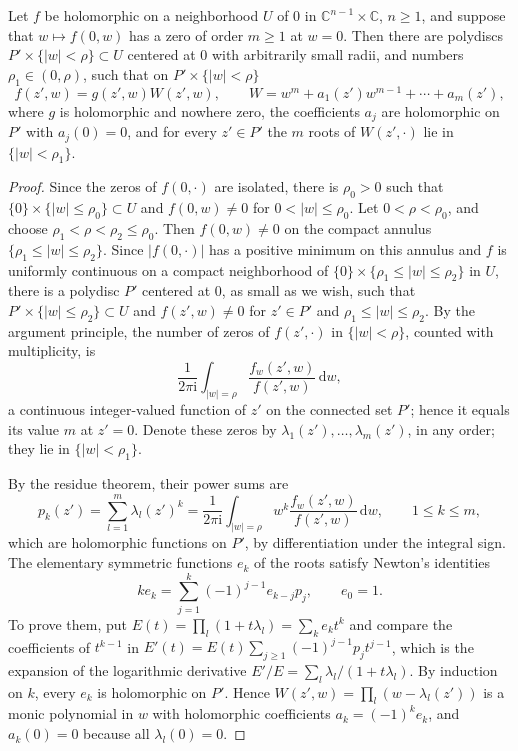 \begin{theorem}\label{thm:local-weierstrass-preparation}
Let $f$ be holomorphic on a neighborhood $U$ of $0$ in $\mathbb{C}^{n-1}\times\mathbb{C}$, $n\geq1$, and suppose that $w\mapsto f(0,w)$ has a zero of order $m\ge1$ at $w=0$. Then there are polydiscs $P'\times\{|w|<\rho\}\subset U$ centered at $0$ with arbitrarily small radii, and numbers $\rho_1\in(0,\rho)$, such that on $P'\times\{|w|<\rho\}$
\[
 f(z',w)=g(z',w)W(z',w),\qquad
 W=w^m+a_1(z')w^{m-1}+\cdots+a_m(z'),
\]
where $g$ is holomorphic and nowhere zero, the coefficients $a_j$ are holomorphic on $P'$ with $a_j(0)=0$, and for every $z'\in P'$ the $m$ roots of $W(z',\cdot)$ lie in $\{|w|<\rho_1\}$.
\end{theorem}
\begin{proof}
Since the zeros of $f(0,\cdot)$ are isolated, there is $\rho_0>0$ such that $\{0\}\times\{|w|\leq\rho_0\}\subset U$ and $f(0,w)\neq0$ for $0<|w|\leq\rho_0$. Let $0<\rho<\rho_0$, and choose $\rho_1<\rho<\rho_2\leq\rho_0$. Then $f(0,w)\neq0$ on the compact annulus $\{\rho_1\leq|w|\leq\rho_2\}$. Since $|f(0,\cdot)|$ has a positive minimum on this annulus and $f$ is uniformly continuous on a compact neighborhood of $\{0\}\times\{\rho_1\leq|w|\leq\rho_2\}$ in $U$, there is a polydisc $P'$ centered at $0$, as small as we wish, such that $P'\times\{|w|\leq\rho_2\}\subset U$ and $f(z',w)\neq0$ for $z'\in P'$ and $\rho_1\leq|w|\leq\rho_2$. By the argument principle, the number of zeros of $f(z',\cdot)$ in $\{|w|<\rho\}$, counted with multiplicity, is
\[
 \frac{1}{2\pi\mathrm{i}}\int_{|w|=\rho}\frac{f_w(z',w)}{f(z',w)}\,\mathrm{d}w,
\]
a continuous integer-valued function of $z'$ on the connected set $P'$; hence it equals its value $m$ at $z'=0$. Denote these zeros by $\lambda_1(z'),\ldots,\lambda_m(z')$, in any order; they lie in $\{|w|<\rho_1\}$.

By the residue theorem, their power sums are
\[
 p_k(z')=\sum_{l=1}^m\lambda_l(z')^k=\frac{1}{2\pi\mathrm{i}}\int_{|w|=\rho}
 w^k\frac{f_w(z',w)}{f(z',w)}\,\mathrm{d}w,\qquad 1\leq k\leq m,
\]
which are holomorphic functions on $P'$, by differentiation under the integral sign. The elementary symmetric functions $e_k$ of the roots satisfy Newton's identities
\[
 ke_k=\sum_{j=1}^k(-1)^{j-1}e_{k-j}p_j,\qquad e_0=1.
\]
To prove them, put $E(t)=\prod_l(1+t\lambda_l)=\sum_ke_kt^k$ and compare the coefficients of $t^{k-1}$ in $E'(t)=E(t)\sum_{j\geq1}(-1)^{j-1}p_jt^{j-1}$, which is the expansion of the logarithmic derivative $E'/E=\sum_l\lambda_l/(1+t\lambda_l)$. By induction on $k$, every $e_k$ is holomorphic on $P'$. Hence $W(z',w)=\prod_l(w-\lambda_l(z'))$ is a monic polynomial in $w$ with holomorphic coefficients $a_k=(-1)^ke_k$, and $a_k(0)=0$ because all $\lambda_l(0)=0$.


\end{proof}

